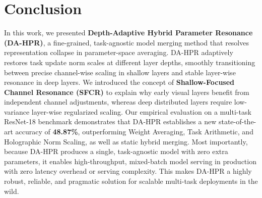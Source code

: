 \documentclass{article}
\theoremstyle{plain}
\theoremstyle{definition}
\theoremstyle{remark}
\begin{document}
\section{Conclusion}
\label{submission3:sec:conclusion}

In this work, we presented \textbf{Depth-Adaptive Hybrid Parameter Resonance (DA-HPR)}, a fine-grained, task-agnostic model merging method that resolves representation collapse in parameter-space averaging.
DA-HPR adaptively restores task update norm scales at different layer depths, smoothly transitioning between precise channel-wise scaling in shallow layers and stable layer-wise resonance in deep layers.
We introduced the concept of \textbf{Shallow-Focused Channel Resonance (SFCR)} to explain why early visual layers benefit from independent channel adjustments, whereas deep distributed layers require low-variance layer-wise regularized scaling.
Our empirical evaluation on a multi-task ResNet-18 benchmark demonstrates that DA-HPR establishes a new state-of-the-art accuracy of \textbf{48.87\%}, outperforming Weight Averaging, Task Arithmetic, and Holographic Norm Scaling, as well as static hybrid merging.
Most importantly, because DA-HPR produces a single, task-agnostic model with zero extra parameters, it enables high-throughput, mixed-batch model serving in production with zero latency overhead or serving complexity.
This makes DA-HPR a highly robust, reliable, and pragmatic solution for scalable multi-task deployments in the wild.



\end{document}
